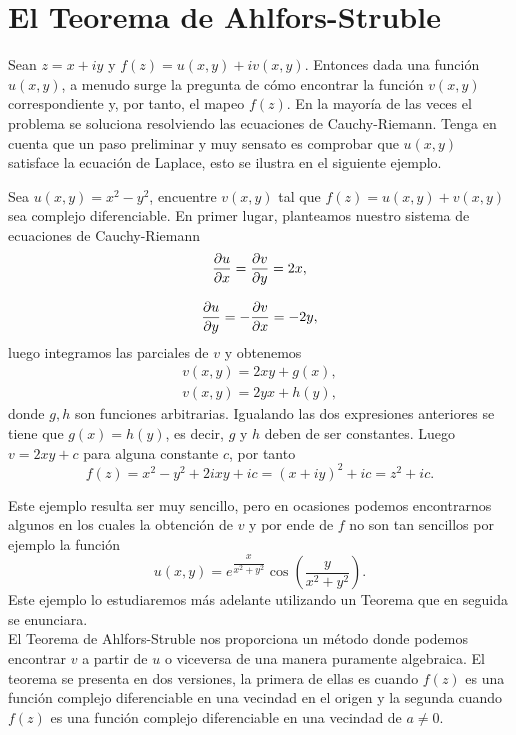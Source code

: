 \section{El Teorema de Ahlfors-Struble}
 Sean $z = x + iy$ y $f(z) = u(x, y)+iv(x, y)$. Entonces dada una función $u(x, y)$, a menudo surge la pregunta de cómo encontrar la función $v(x,y)$ correspondiente y, por tanto, el mapeo  $f(z)$. En la mayoría de las veces el problema se soluciona resolviendo las ecuaciones de Cauchy-Riemann. Tenga en cuenta que un paso preliminar y muy sensato es comprobar que $u(x,y)$  satisface la ecuación de Laplace, esto se ilustra en el siguiente ejemplo.
 \begin{Ejem}\label{EjCR}
 	Sea $u(x,y)=x^2-y^2$, encuentre $v(x,y)$ tal que $f(z)=u(x,y)+v(x,y)$ sea complejo diferenciable.
 	\solu
 	En primer lugar, planteamos nuestro sistema de ecuaciones de Cauchy-Riemann
 	\[
 		\begin{array}{c}
 			\dfrac{\partial u}{\partial x}=\dfrac{\partial v}{\partial y}=2x,\\\\
 			\dfrac{\partial u}{\partial y}=-\dfrac{\partial v}{\partial x}=-2y,
 		\end{array}
 	\]
 	luego integramos las parciales de $v$ y obtenemos
 	\[
 		\begin{array}{c}
 			v(x,y)=2xy+g(x),\\
 			v(x,y)=2yx+h(y),
 		\end{array}
 	\]
 	donde $g,h$ son funciones arbitrarias. Igualando las dos expresiones anteriores se tiene que $g(x)=h(y)$, es decir, $g$ y $h$ deben de ser constantes. Luego $v=2xy+c$ para alguna constante $c$, por tanto 
 	$$f(z)=x^2-y^2+2ixy+ic=(x+iy)^2+ic=z^2+ic.$$\endproof
 \end{Ejem}
Este ejemplo resulta ser muy sencillo, pero en ocasiones podemos encontrarnos algunos en los cuales la obtención  de $v$ y
por ende de $f$ no son tan sencillos por ejemplo  la función 
$$u(x,y)=e^{\dfrac{x}{x^2+y^2}}\cos\left(\dfrac{y}{x^2+y^{2}}\right).$$
Este ejemplo lo estudiaremos más adelante utilizando un Teorema que en seguida se enunciara.\\
El Teorema de Ahlfors-Struble nos proporciona un método donde podemos encontrar $v$ a partir de $u$ o viceversa de una manera puramente algebraica. El teorema se presenta en dos versiones, la primera de ellas es cuando $f(z)$ es una función complejo diferenciable en una vecindad en el origen y la segunda  cuando $f(z)$ es una función complejo diferenciable en una vecindad de $a\neq 0$.


